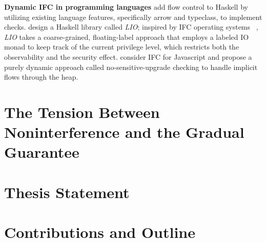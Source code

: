 \textbf{Dynamic IFC in programming languages}
\textcite{li2006encoding,LI20101974} add flow control to Haskell by utilizing
existing language features, specifically arrow and typeclass,
to implement checks.
\textcite{stefan2011flexible,stefan2012flexible,STEFAN:2017ta}
design a Haskell library called \textit{LIO};
inspired by IFC operating systems
~\parencite{efstathopoulos2005labels,zeldovich2011making,krohn2007information,vandebogart2007labels},
\textit{LIO} takes a coarse-grained, floating-label approach that
employs a labeled IO monad to keep track of the current privilege level,
which restricts both the observability and the security effect.
\textcite{austin2009efficient} consider IFC for Javascript and
propose a purely dynamic approach called no-sensitive-upgrade
checking to handle implicit flows through the heap.

\textbf{}

\section{The Tension Between Noninterference and the Gradual Guarantee}

\section{Thesis Statement}

\section{Contributions and Outline}
